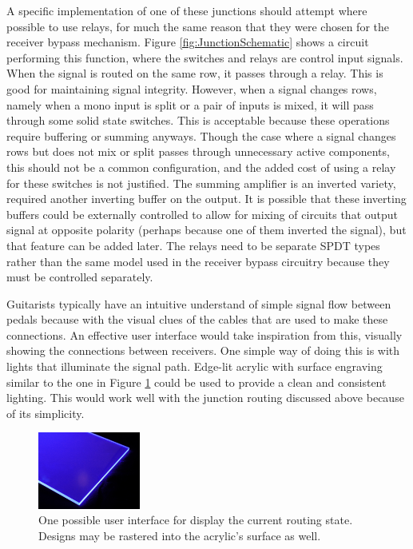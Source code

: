 \documentclass{article}
\begin{document}
		A specific implementation of one of these junctions should attempt where possible to use relays, for much the same reason that they were chosen for the receiver bypass mechanism.  Figure \ref{fig:JunctionSchematic} shows a circuit performing this function, where the switches and relays are control input signals.  When the signal is routed on the same row, it passes through a relay.  This is good for maintaining signal integrity.  However, when a signal changes rows, namely when a mono input is split or a pair of inputs is mixed, it will pass through some solid state switches.  This is acceptable because these operations require buffering or summing anyways.  Though the case where a signal changes rows but does not mix or split passes through unnecessary active components, this should not be a common configuration, and the added cost of using a relay for these switches is not justified.  The summing amplifier is an inverted variety, required another inverting buffer on the output.  It is possible that these inverting buffers could be externally controlled to allow for mixing of circuits that output signal at opposite polarity (perhaps because one of them inverted the signal), but that feature can be added later.  The relays need to be separate SPDT types rather than the same model used in the receiver bypass circuitry because they must be controlled separately.

		Guitarists typically have an intuitive understand of simple signal flow between pedals because with the visual clues of the cables that are used to make these connections.  An effective user interface would take inspiration from this, visually showing the connections between receivers.  One simple way of doing this is with lights that illuminate the signal path.  Edge-lit acrylic with surface engraving similar to the one in Figure \ref{fig:EdgeLitExample} could be used to provide a clean and consistent lighting.  This would work well with the junction routing discussed above because of its simplicity.

		\begin{figure}
			\centering
			\includegraphics[width = 0.3\textwidth]{PR2Images/AcrylicEdge}
			\caption{One possible user interface for display the current routing state.  Designs may be rastered into the acrylic's surface as well.}
			\label{fig:EdgeLitExample}
		\end{figure}
\end{document}
